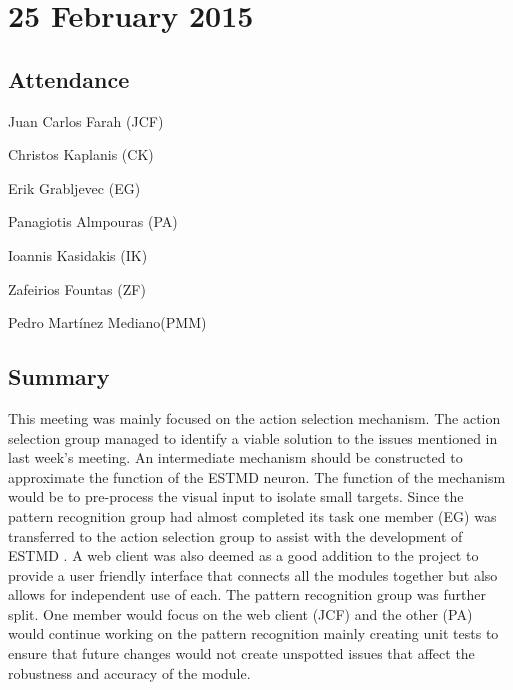 \documentclass[a4paper,11pt]{article}
\begin{document}
\maketitle
\section*{25 February 2015}
\subsection*{Attendance}
\begin{compactenum}
\item Juan Carlos Farah (JCF)
\item Christos Kaplanis (CK)
\item Erik Grabljevec (EG)
\item Panagiotis Almpouras (PA)
\item Ioannis Kasidakis (IK)
\item Zafeirios Fountas (ZF)
\item Pedro Martínez Mediano(PMM)
\end{compactenum}

\subsection*{Summary}
This meeting was mainly focused on the action selection mechanism. The action selection group managed to identify a viable solution to the issues mentioned in last week's meeting. An intermediate mechanism should be constructed to approximate the function of the ESTMD neuron. The function of the mechanism would be to pre-process the visual input to isolate small targets. Since the pattern recognition group had almost completed its task one member (EG) was transferred to the action selection group to assist with the development of  ESTMD . A web client was also deemed as a good addition to the project to provide a user friendly interface that connects all the modules together but also allows for independent use of each. The pattern recognition group was further split. One member would focus on the web client (JCF) and the other (PA) would continue working on the pattern recognition mainly creating unit tests to ensure that future changes would not create unspotted issues that affect the robustness and accuracy of the module.

\maketitle
\end{document}
